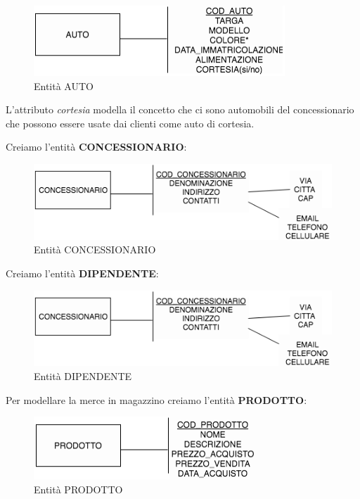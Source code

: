 \begin{center}
\begin{figure}[H]
\centering
\includegraphics[scale=1]{figures/auto_entity.png}
\caption{Entità AUTO}
\end{figure}
\end{center}

L’attributo \textit{cortesia} modella il concetto che ci sono automobili del concessionario che possono essere usate dai clienti come auto di cortesia.

Creiamo l’entità \textbf{CONCESSIONARIO}:

\begin{center}
\begin{figure}[H]
\centering
\includegraphics[scale=1]{figures/concessionario.png}
\caption{Entità CONCESSIONARIO}
\end{figure}
\end{center}

Creiamo l’entità \textbf{DIPENDENTE}:

\begin{center}
\begin{figure}[H]
\centering
\includegraphics[scale=1]{figures/concessionario.png}
\caption{Entità DIPENDENTE}
\end{figure}
\end{center}

Per modellare la merce in magazzino creiamo l’entità \textbf{PRODOTTO}:

\begin{center}
\begin{figure}[H]
\centering
\includegraphics[scale=1]{figures/prodotto.png}
\caption{Entità PRODOTTO}
\end{figure}
\end{center}

